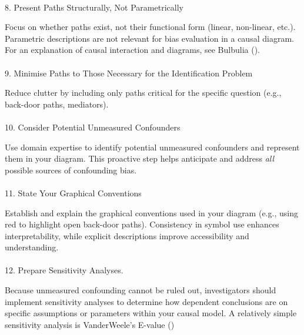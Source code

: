 \documentclass[
  singlecolumn]{article}
\makeatletter
\let\oldparagraph\paragraph
\renewcommand{\paragraph}{
    \@ifstar
      \xxxParagraphStar
      \xxxParagraphNoStar
  }
\newcommand{\xxxParagraphStar}[1]{\oldparagraph*{#1}\mbox{}}
\newcommand{\xxxParagraphNoStar}[1]{\oldparagraph{#1}\mbox{}}
\makeatother
\begin{document}
\paragraph{8. Present Paths Structurally, Not
Parametrically}\label{present-paths-structurally-not-parametrically}

Focus on whether paths exist, not their functional form (linear,
non-linear, etc.). Parametric descriptions are not relevant for bias
evaluation in a causal diagram. For an explanation of causal interaction
and diagrams, see Bulbulia ().

\paragraph{9. Minimise Paths to Those Necessary for the Identification
Problem}\label{minimise-paths-to-those-necessary-for-the-identification-problem}

Reduce clutter by including only paths critical for the specific
question (e.g., back-door paths, mediators).

\paragraph{10. Consider Potential Unmeasured
Confounders}\label{consider-potential-unmeasured-confounders}

Use domain expertise to identify potential unmeasured confounders and
represent them in your diagram. This proactive step helps anticipate and
address \emph{all} possible sources of confounding bias.

\paragraph{11. State Your Graphical
Conventions}\label{state-your-graphical-conventions}

Establish and explain the graphical conventions used in your diagram
(e.g., using red to highlight open back-door paths). Consistency in
symbol use enhances interpretability, while explicit descriptions
improve accessibility and understanding.

\paragraph{12. Prepare Sensitivity
Analyses.}\label{prepare-sensitivity-analyses.}

Because unmeasured confounding cannot be ruled out, investigators should
implement sensitivity analyses to determine how dependent conclusions
are on specific assumptions or parameters within your causal model. A
relatively simple sensitivity analysis is VanderWeele's E-value
()
\end{document}
